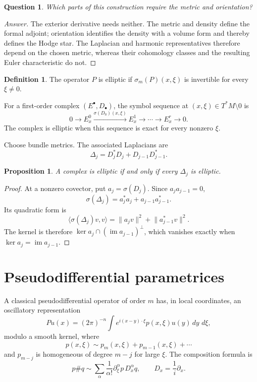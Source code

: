 \documentclass[11pt,oneside,reqno]{book}
\newcommand{\dd}{\,d}
\theoremstyle{plain}
\newtheorem{proposition}[theorem]{Proposition}
\newtheorem{question}[theorem]{Question}
\theoremstyle{definition}
\newtheorem{definition}[theorem]{Definition}
\theoremstyle{remark}
\newenvironment{answer}{\begin{proof}[Answer]}{\end{proof}}
\begin{document}
\begin{question}
Which parts of this construction require the metric and orientation?
\end{question}

\begin{answer}
The exterior derivative needs neither.  The metric and density define the
formal adjoint; orientation identifies the density with a volume form and
thereby defines the Hodge star.  The Laplacian and harmonic representatives
therefore depend on the chosen metric, whereas their cohomology classes and
the resulting Euler characteristic do not.
\end{answer}

\begin{definition}
The operator \(P\) is elliptic if \(\sigma_m(P)(x,\xi)\) is invertible for
every \(\xi\neq0\).
\end{definition}

For a first-order complex \((E^\bullet,D_\bullet)\), the symbol sequence at
\((x,\xi)\in T^*M\setminus0\) is
\[
 0\longrightarrow E_x^0
 \xrightarrow{\sigma(D_0)(x,\xi)}E_x^1
 \longrightarrow\cdots
 \longrightarrow E_x^r
 \longrightarrow0.
\]
The complex is elliptic when this sequence is exact for every nonzero
\(\xi\).

Choose bundle metrics. The associated Laplacians are
\[
 \Delta_j=D_j^*D_j+D_{j-1}D_{j-1}^*.
\]

\begin{proposition}
A complex is elliptic if and only if every \(\Delta_j\) is elliptic.
\end{proposition}

\begin{proof}
At a nonzero covector, put \(a_j=\sigma(D_j)\). Since
\(a_ja_{j-1}=0\),
\[
 \sigma(\Delta_j)=a_j^*a_j+a_{j-1}a_{j-1}^*.
\]
Its quadratic form is
\[
 \langle\sigma(\Delta_j)v,v\rangle
 =
 \lVert a_jv\rVert^2+\lVert a_{j-1}^*v\rVert^2.
\]
The kernel is therefore
\(\ker a_j\cap(\operatorname{im}a_{j-1})^\perp\), which vanishes exactly
when \(\ker a_j=\operatorname{im}a_{j-1}\).
\end{proof}

\section{Pseudodifferential parametrices}

A classical pseudodifferential operator of order \(m\) has, in local
coordinates, an oscillatory representation
\[
 Pu(x)
 =
 (2\pi)^{-n}\int e^{i(x-y)\cdot\xi}p(x,\xi)u(y)
 \dd y\,\dd\xi,
\]
modulo a smooth kernel, where
\[
 p(x,\xi)\sim p_m(x,\xi)+p_{m-1}(x,\xi)+\cdots
\]
and \(p_{m-j}\) is homogeneous of degree \(m-j\) for large \(\xi\).
The composition formula is
\[
 p\# q
 \sim
 \sum_\alpha
 \frac{1}{\alpha!}
 \partial_\xi^\alpha p\,D_x^\alpha q,
 \qquad D_x=\frac1i\partial_x.
\]
\end{document}
